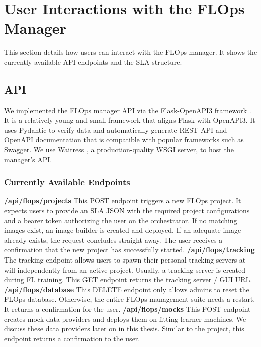 \section{User Interactions with the FLOps Manager}
This section details how users can interact with the FLOps manager.
It shows the currently available API endpoints and the SLA structure.

\subsection{API}
We implemented the FLOps manager API via the Flask-OpenAPI3 framework \cite{framework:flask_openapi3}.
It is a relatively young and small framework that aligns Flask with OpenAPI3.
It uses Pydantic to verify data and automatically generate REST API and OpenAPI documentation that is compatible with popular frameworks such as Swagger.
We use Waitress \cite{waitress}, a production-quality WSGI server, to host the manager's API.

\subsubsection{Currently Available Endpoints}
\textbf{/api/flops/projects}\newline
This POST endpoint triggers a new FLOps project.
It expects users to provide an SLA JSON with the required project configurations and a bearer token authorizing the user on the orchestrator.
If no matching images exist, an image builder is created and deployed.
If an adequate image already exists, the request concludes straight away.
The user receives a confirmation that the new project has successfully started.
\vspace{5mm}
\newline
\textbf{/api/flops/tracking}\newline
The tracking endpoint allows users to spawn their personal tracking servers at will independently from an active project.
Usually, a tracking server is created during FL training.
This GET endpoint returns the tracking server / GUI URL.
\vspace{5mm}
\newline
\textbf{/api/flops/database}\newline
This DELETE endpoint only allows admins to reset the FLOps database.
Otherwise, the entire FLOps management suite needs a restart.
It returns a confirmation for the user.
\vspace{5mm}
\newline
\textbf{/api/flops/mocks}\newline
This POST endpoint creates mock data providers and deploys them on fitting learner machines.
We discuss these data providers later on in this thesis.
Similar to the project, this endpoint returns a confirmation to the user.
\vspace{5mm}
\newline

